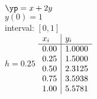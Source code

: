 {
$\yp = x+2y$\\
$y(0)=1$\\
interval: $[0,1]$\\
$h=0.25$
}
{
	$\begin{array}{l | l}
		x_i  & y_i    \\ \hline
		0.00    & 1.0000 \\
		0.25 & 1.5000 \\
		0.50  & 2.3125 \\
		0.75 & 3.5938 \\
		1.00  & 5.5781
	\end{array}$
}